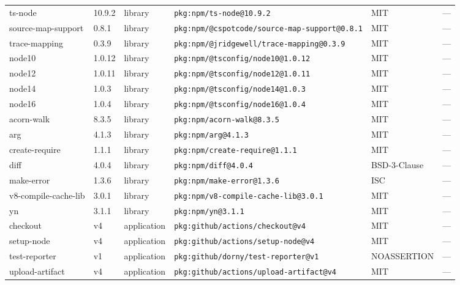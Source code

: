 \documentclass[11pt,a4paper]{article}
\begin{document}
\begin{longtable}{|p{4cm}|p{2cm}|p{1.6cm}|p{5cm}|p{1.5cm}|p{3.5cm}|}
\raggedright ts-node & 10.9.2 & library & \small\texttt{pkg:npm/ts-node@10.9.2} & MIT & \small — \\
\raggedright source-map-support & 0.8.1 & library & \small\texttt{pkg:npm/@cspotcode/source-map-support@0.8.1} & MIT & \small — \\
\raggedright trace-mapping & 0.3.9 & library & \small\texttt{pkg:npm/@jridgewell/trace-mapping@0.3.9} & MIT & \small — \\
\raggedright node10 & 1.0.12 & library & \small\texttt{pkg:npm/@tsconfig/node10@1.0.12} & MIT & \small — \\
\raggedright node12 & 1.0.11 & library & \small\texttt{pkg:npm/@tsconfig/node12@1.0.11} & MIT & \small — \\
\raggedright node14 & 1.0.3 & library & \small\texttt{pkg:npm/@tsconfig/node14@1.0.3} & MIT & \small — \\
\raggedright node16 & 1.0.4 & library & \small\texttt{pkg:npm/@tsconfig/node16@1.0.4} & MIT & \small — \\
\raggedright acorn-walk & 8.3.5 & library & \small\texttt{pkg:npm/acorn-walk@8.3.5} & MIT & \small — \\
\raggedright arg & 4.1.3 & library & \small\texttt{pkg:npm/arg@4.1.3} & MIT & \small — \\
\raggedright create-require & 1.1.1 & library & \small\texttt{pkg:npm/create-require@1.1.1} & MIT & \small — \\
\raggedright diff & 4.0.4 & library & \small\texttt{pkg:npm/diff@4.0.4} & BSD-3-Clause & \small — \\
\raggedright make-error & 1.3.6 & library & \small\texttt{pkg:npm/make-error@1.3.6} & ISC & \small — \\
\raggedright v8-compile-cache-lib & 3.0.1 & library & \small\texttt{pkg:npm/v8-compile-cache-lib@3.0.1} & MIT & \small — \\
\raggedright yn & 3.1.1 & library & \small\texttt{pkg:npm/yn@3.1.1} & MIT & \small — \\
\raggedright checkout & v4 & application & \small\texttt{pkg:github/actions/checkout@v4} & MIT & \small — \\
\raggedright setup-node & v4 & application & \small\texttt{pkg:github/actions/setup-node@v4} & MIT & \small — \\
\raggedright test-reporter & v1 & application & \small\texttt{pkg:github/dorny/test-reporter@v1} & NOASSERTION & \small — \\
\raggedright upload-artifact & v4 & application & \small\texttt{pkg:github/actions/upload-artifact@v4} & MIT & \small — \\
\end{longtable}
\end{document}
